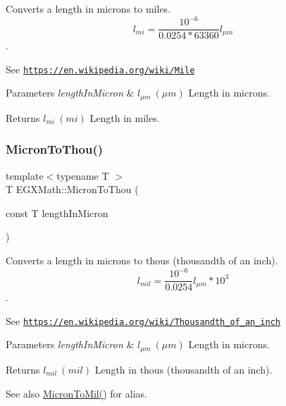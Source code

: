 Converts a length in microns to miles. \[ l_{mi}=\frac{10^{-6}}{0.0254 * 63360} l_{\mu m} \]. 

See \href{https://en.wikipedia.org/wiki/Mile}{\tt https\+://en.\+wikipedia.\+org/wiki/\+Mile} 
\begin{DoxyParams}{Parameters}
{\em length\+In\+Micron} & $ l_{\mu m}\ (\mu m)$ Length in microns. \\
\hline
\end{DoxyParams}
\begin{DoxyReturn}{Returns}
$ l_{mi}\ (mi)$ Length in miles. 
\end{DoxyReturn}
\mbox{\label{group___e_g_x_math-_conversions-_length_conversions-_non-_s_i-_micron-_imperial_gaf75a5aad3349d690e8b1bea619fc8706}} 
\subsubsection{\texorpdfstring{Micron\+To\+Thou()}{MicronToThou()}}
{\footnotesize\ttfamily template$<$typename T $>$ \\
T E\+G\+X\+Math\+::\+Micron\+To\+Thou (\begin{DoxyParamCaption}\item[{const T}]{length\+In\+Micron }\end{DoxyParamCaption})}



Converts a length in microns to thous (thousandth of an inch). \[ l_{mil}= \frac{10^{-6}}{0.0254} l_{\mu m} * 10^{3} \]. 

See \href{https://en.wikipedia.org/wiki/Thousandth_of_an_inch}{\tt https\+://en.\+wikipedia.\+org/wiki/\+Thousandth\+\_\+of\+\_\+an\+\_\+inch} 
\begin{DoxyParams}{Parameters}
{\em length\+In\+Micron} & $ l_{\mu m}\ (\mu m)$ Length in microns. \\
\hline
\end{DoxyParams}
\begin{DoxyReturn}{Returns}
$ l_{mil}\ (mil)$ Length in thous (thousandth of an inch). 
\end{DoxyReturn}
\begin{DoxySeeAlso}{See also}
\mbox{\hyperlink{group___e_g_x_math-_conversions-_length_conversions-_non-_s_i-_micron-_imperial_ga691931fc46e3fd33d4e2d83e09fa3db4}{Micron\+To\+Mil()}} for alias. 
\end{DoxySeeAlso}
\mbox{\label{group___e_g_x_math-_conversions-_length_conversions-_non-_s_i-_micron-_imperial_gae986c2e4dc5b38e249a8ec2fa2a3a0ea}} 
